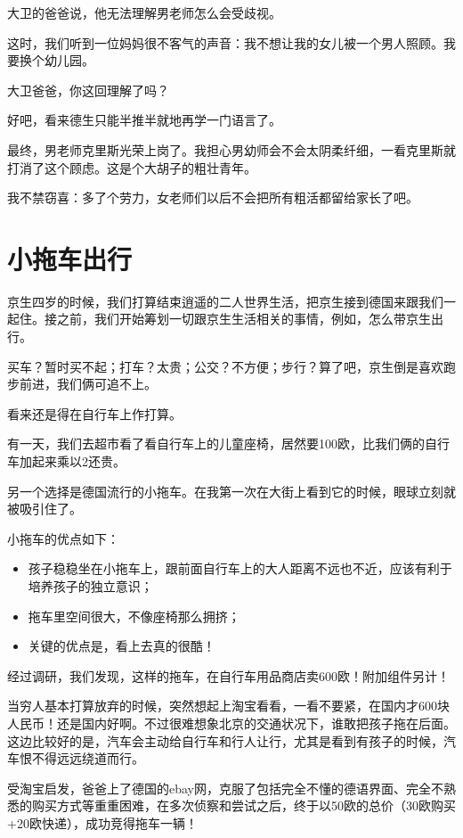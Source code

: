 \documentclass[twoside,openright,headings=optiontohead]{ctexbook} %
\providecommand{\tightlist}{%
   \setlength{\itemsep}{0pt}\setlength{\parskip}{0pt}}
\begin{document}
{大卫的爸爸说，他无法理解男老师怎么会受歧视。

这时，我们听到一位妈妈很不客气的声音：我不想让我的女儿被一个男人照顾。我要换个幼儿园。

大卫爸爸，你这回理解了吗？

好吧，看来德生只能半推半就地再学一门语言了。

最终，男老师克里斯光荣上岗了。我担心男幼师会不会太阴柔纤细，一看克里斯就打消了这个顾虑。这是个大胡子的粗壮青年。

我不禁窃喜：多了个劳力，女老师们以后不会把所有粗活都留给家长了吧。

\chapter*{小拖车出行}\label{trailer}

京生四岁的时候，我们打算结束逍遥的二人世界生活，把京生接到德国来跟我们一起住。接之前，我们开始筹划一切跟京生生活相关的事情，例如，怎么带京生出行。

买车？暂时买不起；打车？太贵；公交？不方便；步行？算了吧，京生倒是喜欢跑步前进，我们俩可追不上。

看来还是得在自行车上作打算。

有一天，我们去超市看了看自行车上的儿童座椅，居然要100欧，比我们俩的自行车加起来乘以2还贵。

另一个选择是德国流行的小拖车。在我第一次在大街上看到它的时候，眼球立刻就被吸引住了。

小拖车的优点如下：

\begin{itemize}
\tightlist
\item
  孩子稳稳坐在小拖车上，跟前面自行车上的大人距离不远也不近，应该有利于培养孩子的独立意识；
\item
  拖车里空间很大，不像座椅那么拥挤；
\item
  关键的优点是，看上去真的很酷！
\end{itemize}

经过调研，我们发现，这样的拖车，在自行车用品商店卖600欧！附加组件另计！

当穷人基本打算放弃的时候，突然想起上淘宝看看，一看不要紧，在国内才600块人民币！还是国内好啊。不过很难想象北京的交通状况下，谁敢把孩子拖在后面。这边比较好的是，汽车会主动给自行车和行人让行，尤其是看到有孩子的时候，汽车恨不得远远绕道而行。

受淘宝启发，爸爸上了德国的ebay网，克服了包括完全不懂的德语界面、完全不熟悉的购买方式等重重困难，在多次侦察和尝试之后，终于以50欧的总价（30欧购买+20欧快递），成功竞得拖车一辆！

}
\end{document}
